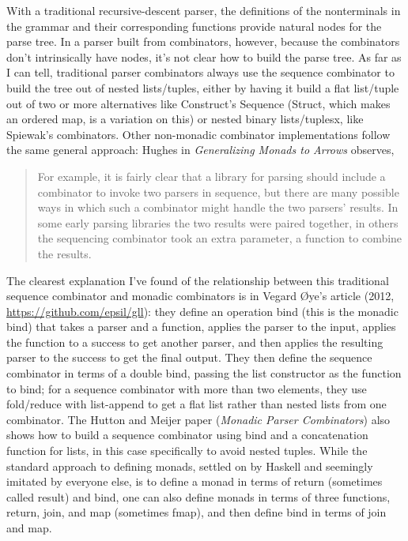 \documentclass[12pt]{article}
\begin{document}
With a traditional recursive-descent parser, the definitions of the
nonterminals in the grammar and their corresponding functions provide
natural nodes for the parse tree.  In a parser built from combinators,
however, because the combinators don't intrinsically have nodes, it's
not clear how to build the parse tree.  As far as I can tell,
traditional parser combinators always use the sequence combinator to
build the tree out of nested lists/tuples, either by having it build a
flat list/tuple out of two or more alternatives like Construct's
Sequence (Struct, which makes an ordered map, is a variation on this)
or nested binary lists/tuplesx, like Spiewak's combinators.  Other
non-monadic combinator implementations follow the same general
approach: Hughes in \emph{Generalizing Monads to Arrows} observes,

\begin{quote}
  For example, it is fairly clear that a library for parsing should
  include a combinator to invoke two parsers in sequence, but there
  are many possible ways in which such a combinator might handle the
  two parsers' results.  In some early parsing libraries the two
  results were paired together, in others the sequencing combinator
  took an extra parameter, a function to combine the results.
\end{quote}

The clearest explanation I've found of the relationship between this
traditional sequence combinator and monadic combinators is in Vegard
\O ye's article (2012, \url{https://github.com/epsil/gll}): they
define an operation bind (this is the monadic bind) that takes a
parser and a function, applies the parser to the input, applies the
function to a success to get another parser, and then applies the
resulting parser to the success to get the final output.  They then
define the sequence combinator in terms of a double bind, passing the
list constructor as the function to bind; for a sequence combinator
with more than two elements, they use fold/reduce with list-append to
get a flat list rather than nested lists from one combinator.  The
Hutton and Meijer paper (\emph{Monadic Parser Combinators}) also shows
how to build a sequence combinator using bind and a concatenation
function for lists, in this case specifically to avoid nested tuples.
While the standard approach to defining monads, settled on by Haskell
and seemingly imitated by everyone else, is to define a monad in terms
of return (sometimes called result) and bind, one can also define
monads in terms of three functions, return, join, and map (sometimes
fmap), and then define bind in terms of join and map.
\end{document}
